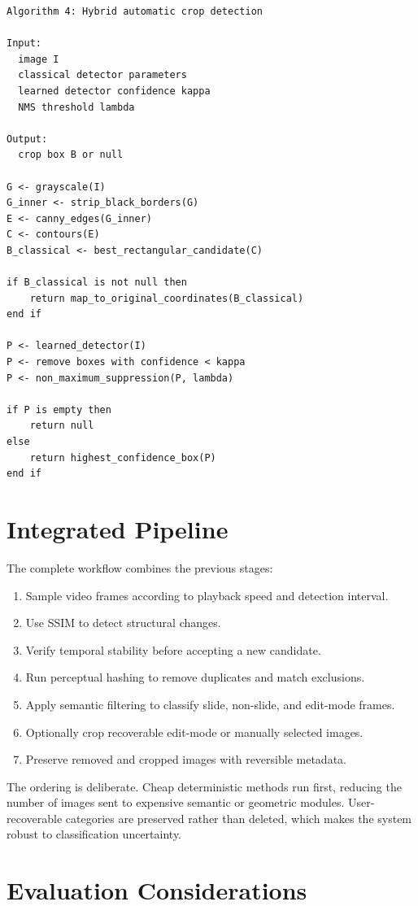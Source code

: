 \documentclass[11pt]{article}
\begin{document}
\begin{verbatim}
Algorithm 4: Hybrid automatic crop detection

Input:
  image I
  classical detector parameters
  learned detector confidence kappa
  NMS threshold lambda

Output:
  crop box B or null

G <- grayscale(I)
G_inner <- strip_black_borders(G)
E <- canny_edges(G_inner)
C <- contours(E)
B_classical <- best_rectangular_candidate(C)

if B_classical is not null then
    return map_to_original_coordinates(B_classical)
end if

P <- learned_detector(I)
P <- remove boxes with confidence < kappa
P <- non_maximum_suppression(P, lambda)

if P is empty then
    return null
else
    return highest_confidence_box(P)
end if
\end{verbatim}

\section{Integrated Pipeline}

The complete workflow combines the previous stages:
\begin{enumerate}
  \item Sample video frames according to playback speed and detection interval.
  \item Use SSIM to detect structural changes.
  \item Verify temporal stability before accepting a new candidate.
  \item Run perceptual hashing to remove duplicates and match exclusions.
  \item Apply semantic filtering to classify slide, non-slide, and edit-mode frames.
  \item Optionally crop recoverable edit-mode or manually selected images.
  \item Preserve removed and cropped images with reversible metadata.
\end{enumerate}

The ordering is deliberate. Cheap deterministic methods run first, reducing the number of images sent to expensive semantic or geometric modules. User-recoverable categories are preserved rather than deleted, which makes the system robust to classification uncertainty.

\section{Evaluation Considerations}
\end{document}
